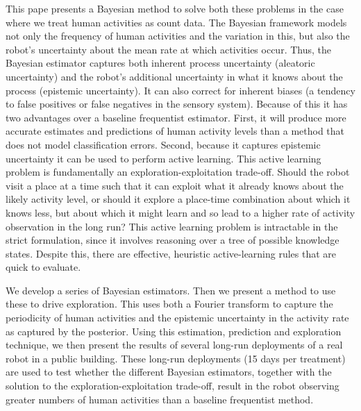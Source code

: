 This pape presents a Bayesian method to solve both these problems in the case where we treat human activities as count data. %
The Bayesian framework models not only the frequency of human activities and the variation in this, but also the robot's uncertainty about the mean rate at which activities occur. Thus, the Bayesian estimator captures both inherent process uncertainty (aleatoric uncertainty) and the robot's additional uncertainty in what it knows about the process (epistemic uncertainty). It can also correct for inherent biases (a tendency to false positives or false negatives in the sensory system). Because of this it has two advantages over a baseline frequentist estimator. First, it will produce more accurate estimates and predictions of human activity levels than a method that does not model classification errors. Second, because it captures epistemic uncertainty it can be used to perform active learning. This active learning problem is fundamentally an exploration-exploitation trade-off. Should the robot visit a place at a time such that it can exploit what it already knows about the likely activity level, or should it explore a place-time combination about which it knows less, but about which it might learn and so lead to a higher rate of activity observation in the long run? This active learning problem is intractable in the strict formulation, since it involves reasoning over a tree of possible knowledge states. Despite this, there are effective, heuristic active-learning rules that are quick to evaluate. %

We develop a series of Bayesian estimators. Then we present a method to use these to drive exploration. This uses both a Fourier transform to capture the periodicity of human activities and the epistemic uncertainty in the activity rate as captured by the posterior. Using this estimation, prediction and exploration technique, we then present the results of several long-run deployments of a real robot in a public building. These long-run deployments (15 days per treatment) are used to test whether the different Bayesian estimators, together with the solution to the exploration-exploitation trade-off, result in the robot observing greater numbers of human activities than a baseline frequentist method.


